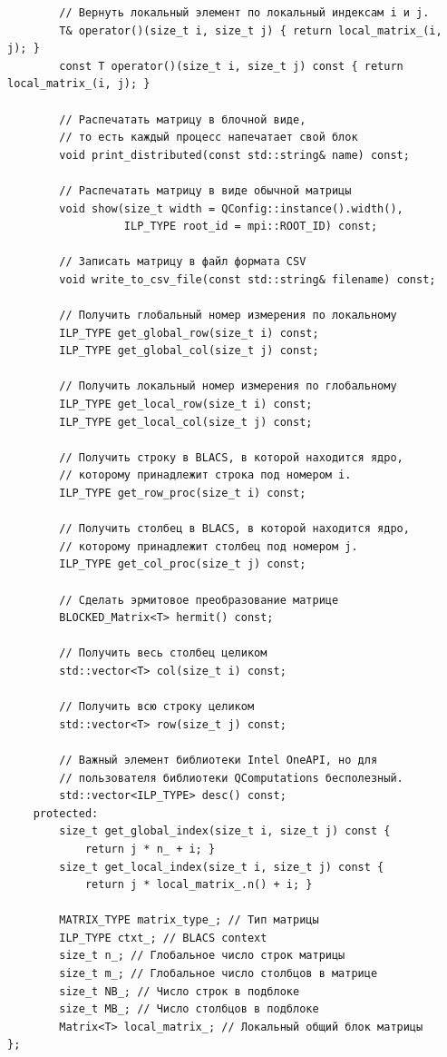 \documentclass[12pt,fleqn]{article}
\begin{document}
\begin{mdframed}[linecolor=black, topline=true, bottomline=true,
            leftline=false, rightline=false]
\begin{verbatim}
        // Вернуть локальный элемент по локальный индексам i и j.
        T& operator()(size_t i, size_t j) { return local_matrix_(i, j); }
        const T operator()(size_t i, size_t j) const { return local_matrix_(i, j); }

        // Распечатать матрицу в блочной виде, 
        // то есть каждый процесс напечатает свой блок
        void print_distributed(const std::string& name) const;

        // Распечатать матрицу в виде обычной матрицы
        void show(size_t width = QConfig::instance().width(), 
                  ILP_TYPE root_id = mpi::ROOT_ID) const;

        // Записать матрицу в файл формата CSV
        void write_to_csv_file(const std::string& filename) const;

        // Получить глобальный номер измерения по локальному
        ILP_TYPE get_global_row(size_t i) const;
        ILP_TYPE get_global_col(size_t j) const;

        // Получить локальный номер измерения по глобальному
        ILP_TYPE get_local_row(size_t i) const;
        ILP_TYPE get_local_col(size_t j) const;

        // Получить строку в BLACS, в которой находится ядро, 
        // которому принадлежит строка под номером i.
        ILP_TYPE get_row_proc(size_t i) const;

        // Получить столбец в BLACS, в которой находится ядро, 
        // которому принадлежит столбец под номером j.
        ILP_TYPE get_col_proc(size_t j) const;

        // Сделать эрмитовое преобразование матрице
        BLOCKED_Matrix<T> hermit() const;

        // Получить весь столбец целиком
        std::vector<T> col(size_t i) const;

        // Получить всю строку целиком
        std::vector<T> row(size_t j) const;

        // Важный элемент библиотеки Intel OneAPI, но для 
        // пользователя библиотеки QComputations бесполезный.
        std::vector<ILP_TYPE> desc() const;
    protected:
        size_t get_global_index(size_t i, size_t j) const { 
            return j * n_ + i; }
        size_t get_local_index(size_t i, size_t j) const { 
            return j * local_matrix_.n() + i; }

        MATRIX_TYPE matrix_type_; // Тип матрицы
        ILP_TYPE ctxt_; // BLACS context
        size_t n_; // Глобальное число строк матрицы
        size_t m_; // Глобальное число столбцов в матрице
        size_t NB_; // Число строк в подблоке
        size_t MB_; // Число столбцов в подблоке
        Matrix<T> local_matrix_; // Локальный общий блок матрицы
};

\end{verbatim}
\end{mdframed}
\end{document}
